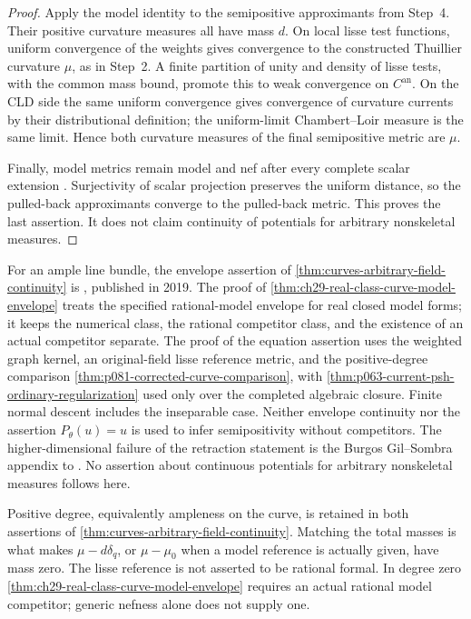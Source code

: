 \begin{proof}
Apply the model identity to the semipositive approximants from Step~4.
Their positive curvature measures all have mass \(d\).  On local
lisse test functions, uniform convergence of the weights gives
convergence to the constructed Thuillier curvature \(\mu\), as in
Step~2.  A finite partition of unity and density of lisse tests,
with the common mass bound, promote this to weak convergence on
\(C^{\mathrm{an}}\).  On the CLD side the same uniform convergence
gives convergence of curvature currents by their distributional
definition; the uniform-limit Chambert--Loir measure is the same
limit.  Hence both curvature measures of the final semipositive
metric are \(\mu\).

Finally, model metrics remain model and nef after every complete
scalar extension \cite[Proposition~2.18(a) and Lemma~3.3]{GM19}.
Surjectivity of scalar projection preserves the uniform distance,
so the pulled-back approximants converge to the pulled-back metric.
This proves the last assertion.  It does not claim continuity of
potentials for arbitrary nonskeletal measures.
\end{proof}


\begin{remark}
\label{rem:ch29-curve-source}
For an ample line bundle, the envelope assertion of
\cref{thm:curves-arbitrary-field-continuity} is
\cite[Theorem~1.1]{GJKM19}, published in 2019.
The proof of \cref{thm:ch29-real-class-curve-model-envelope} treats
the specified rational-model envelope for real closed model forms;
it keeps the numerical class, the rational competitor class, and the
existence of an actual competitor separate.
The proof of the equation assertion uses the weighted graph kernel,
an original-field lisse reference metric, and the positive-degree
comparison \cref{thm:p081-corrected-curve-comparison}, with
\cref{thm:p063-current-psh-ordinary-regularization} used only over the
completed algebraic closure.  Finite normal descent includes the
inseparable case.  Neither envelope continuity nor the assertion
\(P_\theta(u)=u\) is used to infer semipositivity without competitors.
The higher-dimensional failure of the retraction statement is the
Burgos Gil--Sombra appendix to \cite{GJKM19}.
No assertion about continuous potentials for arbitrary nonskeletal
measures follows here.
\end{remark}

\begin{remark}
\label{rem:ch29-curve-nef-ample}
Positive degree, equivalently ampleness on the curve, is retained in
both assertions of \cref{thm:curves-arbitrary-field-continuity}.
Matching the total masses is what makes
\(\mu-d\delta_q\), or \(\mu-\mu_0\) when a model reference is actually
given, have mass zero.  The lisse reference is not asserted to be rational
formal.  In degree zero \cref{thm:ch29-real-class-curve-model-envelope}
requires an actual rational model competitor; generic nefness alone
does not supply one.
\end{remark}
